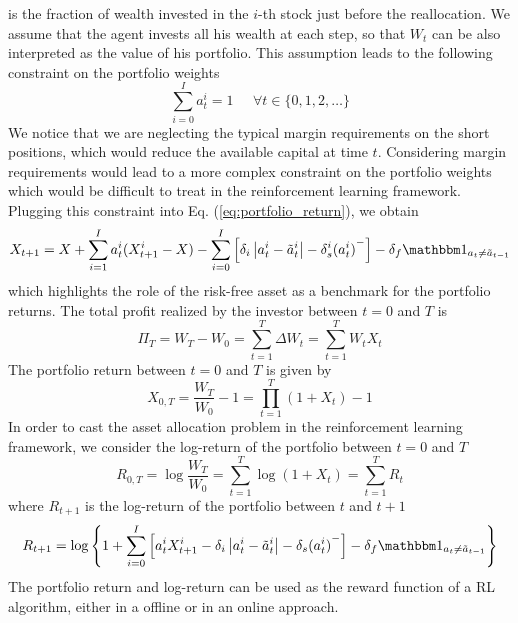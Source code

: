is the fraction of wealth invested in the $i$-th stock just before the 
reallocation. We assume that the agent invests all his wealth at each step, so 
that $W_t$ can be also interpreted as the value of his portfolio. This 
assumption leads to the following constraint on the portfolio weights
\begin{equation}
	\sum^{I}_{i=0} a_t^i = 1 \;\;\;\;\; \forall t \in \{0, 1, 2, \ldots\}
\end{equation}
We notice that we are neglecting the typical margin requirements on the short
positions, which would reduce the available capital at time $t$. Considering
margin requirements would lead to a more complex constraint on the portfolio
weights which would be difficult to treat in the reinforcement learning
framework. Plugging this constraint into Eq. (\ref{eq:portfolio_return}), we
obtain
\begin{equation}\label{eq:portfolio_return_benchmark}
	X_{t+1} = X + \sum^{I}_{i=1} a_t^i (X_{t+1}^i - X) - \sum^{I}_{i=0}
	\left[\delta_i \left| a_t^i - \tilde{a}_t^i \right| - \delta_s^i
	{(a_t^i)}^-\right] - \delta_f \ind{{a}_t \neq \tilde{{a}}_{t-1}}   
\end{equation}
which highlights the role of the risk-free asset as a benchmark for the 
portfolio returns. The total profit realized by the investor between $t=0$ and
$T$ is 
\begin{equation*}
	\Pi_T = W_T - W_0 = \sum^{T}_{t=1} \Delta W_t = \sum^{T}_{t=1} W_t X_t  
\end{equation*}
The portfolio return between $t=0$ and $T$ is given by
\begin{equation*}
	X_{0,T} = \frac{W_T}{W_0} - 1 = \prod_{t=1}^T (1+X_t) - 1
\end{equation*}
In order to cast the asset allocation problem in the reinforcement learning
framework, we consider the log-return of the portfolio between $t=0$ and $T$
\begin{equation}
	R_{0,T} = \log \frac{W_T}{W_0} = \sum^{T}_{t=1} \log(1+X_t) = \sum_{t=1}^T
	R_t
\end{equation}
where $R_{t+1}$ is the log-return of the portfolio between $t$ and $t+1$
\begin{equation}
	R_{t+1} = \log \left\{ 1 + \sum^{I}_{i=0} \left[ a_t^i X_{t+1}^i - \delta_i
	\left| a_t^i - \tilde{a}_t^i \right| - \delta_s {(a_t^i)}^- \right] -
	\delta_f \ind{{a}_t \neq \tilde{{a}}_{t-1}}\right\}
\end{equation}
The portfolio return and log-return can be used as the reward function of a
RL algorithm, either in a offline or in an online approach.

